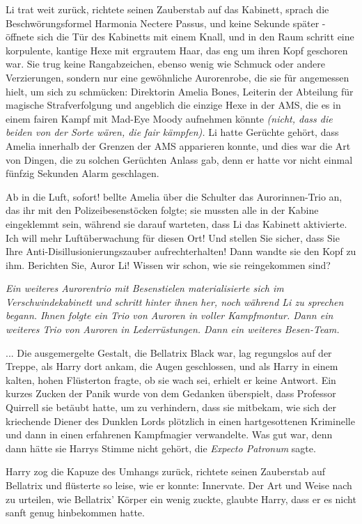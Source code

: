 Li trat weit zurück, richtete seinen Zauberstab auf das Kabinett, sprach die
Beschwörungsformel \glqq{}Harmonia Nectere Passus\grqq{}, und keine Sekunde
später - öffnete sich die Tür des Kabinetts mit einem Knall, und in den Raum
schritt eine korpulente, kantige Hexe mit ergrautem Haar, das eng um ihren Kopf
geschoren war. Sie trug keine Rangabzeichen, ebenso wenig wie Schmuck oder
andere Verzierungen, sondern nur eine gewöhnliche Aurorenrobe, die sie für
angemessen hielt, um sich zu schmücken: Direktorin Amelia Bones, Leiterin der
Abteilung für magische Strafverfolgung und angeblich die einzige Hexe in der
AMS, die es in einem fairen Kampf mit Mad-Eye Moody aufnehmen könnte
\emph{(nicht, dass die beiden von der Sorte wären, die fair kämpfen).} Li hatte
Gerüchte gehört, dass Amelia innerhalb der Grenzen der AMS apparieren konnte,
und dies war die Art von Dingen, die zu solchen Gerüchten Anlass gab, denn er
hatte vor nicht einmal fünfzig Sekunden Alarm geschlagen.

\glqq{}Ab in die Luft, sofort!\grqq{} bellte Amelia über die Schulter das
Aurorinnen-Trio an, das ihr mit den Polizeibesenstöcken folgte; sie mussten alle
in der Kabine eingeklemmt sein, während sie darauf warteten, dass Li das
Kabinett aktivierte. \glqq{}Ich will mehr Luftüberwachung für diesen Ort! Und
stellen Sie sicher, dass Sie Ihre Anti-Disillusionierungszauber
aufrechterhalten!\grqq{} Dann wandte sie den Kopf zu ihm. \glqq{}Berichten Sie, Auror
Li! Wissen wir schon, wie sie reingekommen sind?\grqq{}

\emph{Ein weiteres Aurorentrio mit Besenstielen materialisierte sich im
Verschwindekabinett und schritt hinter ihnen her, noch während Li zu sprechen
begann. Ihnen folgte ein Trio von Auroren in voller Kampfmontur. Dann ein
weiteres Trio von Auroren in Lederrüstungen. Dann ein weiteres Besen-Team.}

... Die ausgemergelte Gestalt, die Bellatrix Black war, lag regungslos auf der
Treppe, als Harry dort ankam, die Augen geschlossen, und als Harry in einem
kalten, hohen Flüsterton fragte, ob sie wach sei, erhielt er keine Antwort. Ein
kurzes Zucken der Panik wurde von dem Gedanken überspielt, dass Professor
Quirrell sie betäubt hatte, um zu verhindern, dass sie mitbekam, wie sich der
kriechende Diener des Dunklen Lords plötzlich in einen hartgesottenen Kriminelle
und dann in einen erfahrenen Kampfmagier verwandelte. Was gut war, denn dann
hätte sie Harrys Stimme nicht gehört, die \emph{\glqq{}Expecto Patronum\grqq{}
}sagte.

Harry zog die Kapuze des Umhangs zurück, richtete seinen Zauberstab auf
Bellatrix und flüsterte so leise, wie er konnte: \glqq{}Innervate.\grqq{} Der Art
und Weise nach zu urteilen, wie Bellatrix' Körper ein wenig zuckte, glaubte
Harry, dass er es nicht sanft genug hinbekommen hatte.

